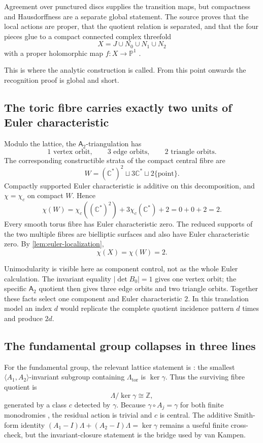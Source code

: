 \documentclass[11pt,reqno]{amsart}
\numberwithin{equation}{section}
\newcommand{\Z}{\mathbb Z}
\newcommand{\C}{\mathbb C}
\newcommand{\Pone}{\mathbb P^1}
\newcommand{\LambdaTor}{\Lambda_{\mathrm{tor}}}
\newcommand{\chic}{\chi_c}
\newcommand{\Aroot}{\mathsf{A}_2}
\theoremstyle{definition}
\begin{document}
Agreement over punctured discs supplies the transition maps, but compactness and Hausdorffness are a separate global statement. The source proves that the local actions are proper, that the quotient relation is separated, and that the four pieces glue to a compact connected complex threefold
\[
X=J\cup N_0\cup N_1\cup N_2
\]
with a proper holomorphic map $f:X\to\Pone$ \cite[Thm.~4.5, Thm.~5.4, Thm.~6.2]{S6}.

This is where the analytic construction is called. From this point onwards the recognition proof is global and short.

\subsection{The toric fibre carries exactly two units of Euler characteristic}

Modulo the lattice, the $\Aroot$-triangulation has
\[
1\text{ vertex orbit},
\qquad
3\text{ edge orbits},
\qquad
2\text{ triangle orbits}.
\]
The corresponding constructible strata of the compact central fibre are
\[
W=(\C^*)^2\sqcup 3\C^*\sqcup 2\{\mathrm{point}\}.
\]
Compactly supported Euler characteristic is additive on this decomposition, and $\chi=\chic$ on compact $W$. Hence
\begin{equation}\label{eq:eW}
\chi(W)=\chic((\C^*)^2)+3\chic(\C^*)+2=0+0+2=2.
\end{equation}
Every smooth torus fibre has Euler characteristic zero. The reduced supports of the two multiple fibres are bielliptic surfaces and also have Euler characteristic zero. By \cref{lem:euler-localization},
\begin{equation}\label{eq:eX}
\chi(X)=\chi(W)=2.
\end{equation}

Unimodularity is visible here as component control, not as the whole Euler calculation. The invariant equality $|\det B_0|=1$ gives one vertex orbit; the specific $\Aroot$ quotient then gives three edge orbits and two triangle orbits. Together these facts select one component and Euler characteristic $2$. In this translation model an index $d$ would replicate the complete quotient incidence pattern $d$ times and produce $2d$.

\subsection{The fundamental group collapses in three lines}\label{sec:pi1}

For the fundamental group, the relevant lattice statement is \cite[Lem.~2.7(iv)]{S6}: the smallest $\langle A_1,A_2\rangle$-invariant subgroup containing $\LambdaTor$ is $\ker\gamma$. Thus the surviving fibre quotient is
\[
\Lambda/\ker\gamma\cong\Z,
\]
generated by a class $c$ detected by $\gamma$. Because $\gamma\circ A_j=\gamma$ for both finite monodromies \cite[Lem.~2.7(iii)]{S6}, the residual action is trivial and $c$ is central. The additive Smith-form identity $(A_1-I)\Lambda+(A_2-I)\Lambda=\ker\gamma$ remains a useful finite cross-check, but the invariant-closure statement is the bridge used by van Kampen.
\end{document}
